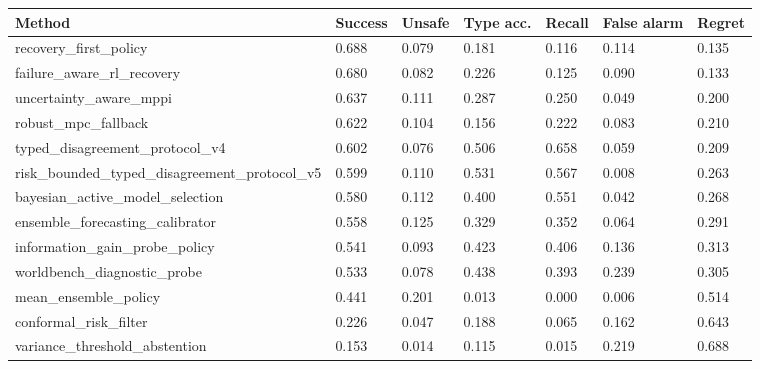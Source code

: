 \begin{tabular}{lllllll}
\toprule
Method & Success & Unsafe & Type acc. & Recall & False alarm & Regret \\
\midrule
recovery\_first\_policy & 0.688 & 0.079 & 0.181 & 0.116 & 0.114 & 0.135 \\
failure\_aware\_rl\_recovery & 0.680 & 0.082 & 0.226 & 0.125 & 0.090 & 0.133 \\
uncertainty\_aware\_mppi & 0.637 & 0.111 & 0.287 & 0.250 & 0.049 & 0.200 \\
robust\_mpc\_fallback & 0.622 & 0.104 & 0.156 & 0.222 & 0.083 & 0.210 \\
typed\_disagreement\_protocol\_v4 & 0.602 & 0.076 & 0.506 & 0.658 & 0.059 & 0.209 \\
risk\_bounded\_typed\_disagreement\_protocol\_v5 & 0.599 & 0.110 & 0.531 & 0.567 & 0.008 & 0.263 \\
bayesian\_active\_model\_selection & 0.580 & 0.112 & 0.400 & 0.551 & 0.042 & 0.268 \\
ensemble\_forecasting\_calibrator & 0.558 & 0.125 & 0.329 & 0.352 & 0.064 & 0.291 \\
information\_gain\_probe\_policy & 0.541 & 0.093 & 0.423 & 0.406 & 0.136 & 0.313 \\
worldbench\_diagnostic\_probe & 0.533 & 0.078 & 0.438 & 0.393 & 0.239 & 0.305 \\
mean\_ensemble\_policy & 0.441 & 0.201 & 0.013 & 0.000 & 0.006 & 0.514 \\
conformal\_risk\_filter & 0.226 & 0.047 & 0.188 & 0.065 & 0.162 & 0.643 \\
variance\_threshold\_abstention & 0.153 & 0.014 & 0.115 & 0.015 & 0.219 & 0.688 \\
\bottomrule
\end{tabular}

